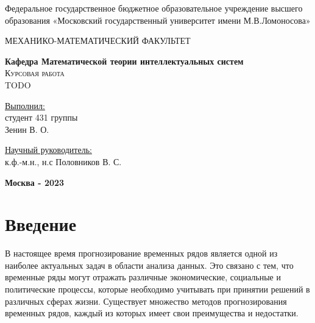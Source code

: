 \documentclass[diploma]{nanolab2015}
\begin{document}
\begin{titlepage}
    \begin{center}
        \large
        Федеральное государственное бюджетное образовательное учреждение
        высшего образования «Московский государственный университет имени
        М.В.Ломоносова»

        МЕХАНИКО-МАТЕМАТИЧЕСКИЙ ФАКУЛЬТЕТ

        \textbf{Кафедра Математической теории интеллектуальных систем}\\
        \vspace{4cm}
        \textsc{\Large Курсовая работа}\\[5mm]
        {\LARGE TODO}
    \end{center}
    \vspace{3cm}
    \null

    \begin{flushright}
        \normalsize \underline{Выполнил:}
        \\студент 431 группы
        \\Зенин В. О.
        \\ \underline{\hspace{4cm}}
    \end{flushright}
    \vspace{1cm}

    \begin{flushright}
        \normalsize \underline{Научный руководитель:}
        \\к.ф.-м.н., н.с Половников В. С.
        \\ \underline{\hspace{4cm}}
    \end{flushright}

    \vfill
    \begin{center}
        \textbf{Москва - 2023}
    \end{center}
\end{titlepage}
\setcounter{page}{2}
\tableofcontents{}  %
\newpage

\section{Введение}
В настоящее время прогнозирование временных рядов является одной из наиболее актуальных задач в области анализа данных. Это связано с тем, что временные ряды могут отражать различные экономические, социальные и политические процессы, которые необходимо учитывать при принятии решений в различных сферах жизни. Существует множество методов прогнозирования временных рядов, каждый из которых имеет свои преимущества и недостатки.
\end{document}
